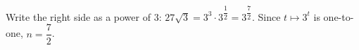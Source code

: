 Write the right side as a power of $3$: $27\sqrt3=3^3\cdot3^{\dfrac{1}{2}}=3^{\dfrac{7}{2}}$. Since $t\mapsto3^t$ is one-to-one, $n=\boxed{\dfrac{7}{2}}$.
